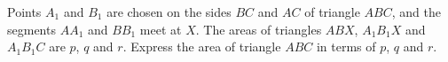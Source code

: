 Points $A_1$ and $B_1$ are chosen on the sides $BC$ and $AC$ of triangle $ABC$, and the segments $AA_1$ and $BB_1$ meet at $X$. The areas of triangles $ABX$, $A_1B_1X$ and $A_1B_1C$ are $p$, $q$ and $r$. Express the area of triangle $ABC$ in terms of $p$, $q$ and $r$.
